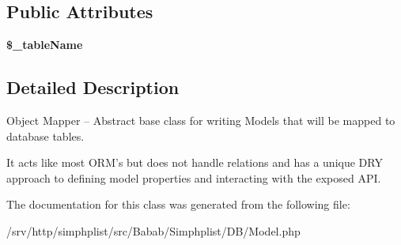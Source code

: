 \subsection*{Public Attributes}
\begin{DoxyCompactItemize}
\item 
\hypertarget{classBabab_1_1Simphplist_1_1DB_1_1Model_a0d4eb5374d3ecfe379cdf7a9c58af6ce}{{\bfseries \$\+\_\+table\+Name}}\label{classBabab_1_1Simphplist_1_1DB_1_1Model_a0d4eb5374d3ecfe379cdf7a9c58af6ce}

\end{DoxyCompactItemize}


\subsection{Detailed Description}
Object Mapper -- Abstract base class for writing Models that will be mapped to database tables. 

It acts like most O\+R\+M's but does not handle relations and has a unique D\+R\+Y approach to defining model properties and interacting with the exposed A\+P\+I. 

The documentation for this class was generated from the following file\+:\begin{DoxyCompactItemize}
\item 
/srv/http/simphplist/src/\+Babab/\+Simphplist/\+D\+B/Model.\+php\end{DoxyCompactItemize}
